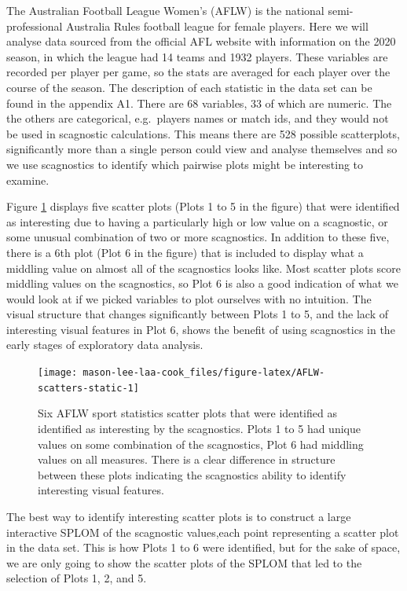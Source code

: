 The Australian Football League Women's (AFLW) is the national semi-professional Australia Rules football league for female players. Here we will analyse data sourced from the official AFL website with information on the 2020 season, in which the league had 14 teams and 1932 players. These variables are recorded per player per game, so the stats are averaged for each player over the course of the season. The description of each statistic in the data set can be found in the appendix A1. There are 68 variables, 33 of which are numeric. The the others are categorical, e.g.~players names or match ids, and they would not be used in scagnostic calculations. This means there are 528 possible scatterplots, significantly more than a single person could view and analyse themselves and so we use scagnostics to identify which pairwise plots might be interesting to examine.

Figure \ref{fig:AFLW-scatters-static} displays five scatter plots (Plots 1 to 5 in the figure) that were identified as interesting due to having a particularly high or low value on a scagnostic, or some unusual combination of two or more scagnostics. In addition to these five, there is a 6th plot (Plot 6 in the figure) that is included to display what a middling value on almost all of the scagnostics looks like. Most scatter plots score middling values on the scagnostics, so Plot 6 is also a good indication of what we would look at if we picked variables to plot ourselves with no intuition. The visual structure that changes significantly between Plots 1 to 5, and the lack of interesting visual features in Plot 6, shows the benefit of using scagnostics in the early stages of exploratory data analysis.

\begin{figure}

{\centering \texttt{[image: mason-lee-laa-cook\_files/figure-latex/AFLW-scatters-static-1]} 

}

\caption{Six AFLW sport statistics scatter plots that were identified as identified as interesting by the scagnostics. Plots 1 to 5 had unique values on some combination of the scagnostics, Plot 6 had middling values on all measures. There is a clear difference in structure between these plots indicating the scagnostics ability to identify interesting visual features.}\label{fig:AFLW-scatters-static}
\end{figure}

The best way to identify interesting scatter plots is to construct a large interactive SPLOM of the scagnostic values,each point representing a scatter plot in the data set. This is how Plots 1 to 6 were identified, but for the sake of space, we are only going to show the scatter plots of the SPLOM that led to the selection of Plots 1, 2, and 5.


